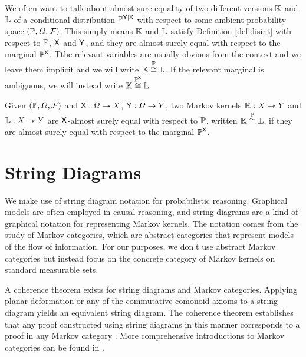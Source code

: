 We often want to talk about almost sure equality of two different versions $\mathbb{K}$ and $\mathbb{L}$ of a conditional distribution $\mathbb{P}^{\mathsf{Y}|\mathsf{X}}$ with respect to some ambient probability space $(\mathbb{P},\Omega,\mathcal{F})$. This simply means $\mathbb{K}$ and $\mathbb{L}$ satisfy Definition \ref{def:disint} with respect to $\mathbb{P}$, $\mathsf{X}$ and $\mathsf{Y}$, and they are almost surely equal with respect to the marginal $\mathbb{P}^{\mathsf{X}}$. Tthe relevant variables are usually obvious from the context and we leave them implicit and we will write $\mathbb{K}\overset{\mathbb{P}}{\cong}\mathbb{L}$. If the relevant marginal is ambiguous, we will instead write $\mathbb{K}\overset{\mathbb{P}^{\mathsf{X}}}{\cong}\mathbb{L}$

\begin{definition}
Given $(\mathbb{P},\Omega,\mathcal{F})$ and $\mathsf{X}:\Omega\to X$, $\mathsf{Y}:\Omega\to Y$, two Markov kernels $\mathbb{K}:X\rightarrowtriangle Y$ and $\mathbb{L}:X\rightarrowtriangle Y$ are $\mathsf{X}$-almost surely equal with respect to $\mathbb{P}$, written $\mathbb{K}\overset{\mathbb{P}}{\cong}\mathbb{L}$, if they are almost surely equal with respect to the marginal $\mathbb{P}^{\mathsf{X}}$.
\end{definition}



\section{String Diagrams}\label{ssec:mken_diagrams}

We make use of string diagram notation for probabilistic reasoning. Graphical models are often employed in causal reasoning, and string diagrams are a kind of graphical notation for representing Markov kernels. The notation comes from the study of Markov categories, which are abstract categories that represent models of the flow of information. For our purposes, we don't use abstract Markov categories but instead focus on the concrete category of Markov kernels on standard measurable sets.

A coherence theorem exists for string diagrams and Markov categories. Applying planar deformation or any of the commutative comonoid axioms to a string diagram yields an equivalent string diagram. The coherence theorem establishes that any proof constructed using string diagrams in this manner corresponds to a proof in any Markov category \citep{selinger_survey_2011}. More comprehensive introductions to Markov categories can be found in \citet{fritz_synthetic_2020,cho_disintegration_2019}.

